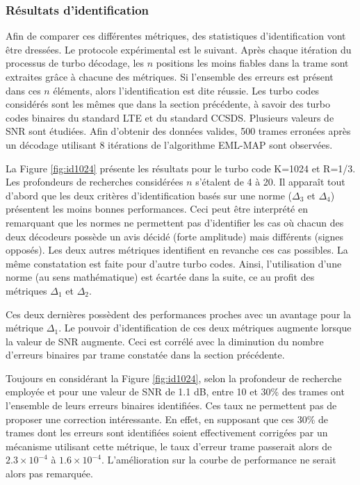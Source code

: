 \subsubsection{Résultats d'identification}
Afin de comparer ces différentes métriques, des statistiques d'identification vont être dressées. Le protocole 
expérimental est le suivant. Après chaque itération du processus de turbo décodage, les $n$ positions les moins fiables
dans la trame sont extraites grâce à chacune des métriques. Si l'ensemble des erreurs est présent dans ces $n$ éléments,
alors l'identification est dite réussie. Les turbo codes considérés sont les mêmes que dans la section précédente, à 
savoir des turbo codes binaires du standard LTE et du standard CCSDS. Plusieurs valeurs de SNR sont étudiées. Afin 
d'obtenir des données valides, 500 trames erronées après un décodage utilisant 8 itérations de l'algorithme EML-MAP sont
observées.

La Figure \ref{fig:id1024} présente les résultats pour le turbo code K=1024 et R=1/3. Les profondeurs de recherches 
considérées $n$ s'étalent de 4 à 20. Il apparaît tout d'abord que 
les deux critères d'identification basés sur une norme ($\Delta_3$ et $\Delta_4$) présentent les moins bonnes performances.
 Ceci peut être interprété en remarquant que les normes ne permettent pas d'identifier les
cas où chacun des deux décodeurs possède un avis décidé (forte amplitude) mais différents (signes opposés). Les deux 
autres métriques identifient en revanche ces cas possibles. La même constatation est faite pour d'autre turbo codes. 
Ainsi, l'utilisation d'une norme (au sens mathématique) est écartée dans la suite, ce au profit des métriques $\Delta_1$ 
et $\Delta_2$.

Ces deux dernières possèdent des performances proches avec un avantage pour la métrique $\Delta_1$. Le pouvoir 
d'identification de ces deux métriques augmente lorsque la valeur de SNR augmente. Ceci est corrélé avec la diminution du 
nombre d'erreurs binaires par trame constatée dans la section précédente.

Toujours en considérant la Figure \ref{fig:id1024}, selon la profondeur de recherche employée et pour une valeur de SNR 
de 1.1 dB, entre 10 et 30\% des trames ont l'ensemble de leurs erreurs binaires identifiées. Ces taux ne 
permettent pas de proposer une correction intéressante. En effet, en supposant que ces 30\% de trames dont les erreurs sont 
identifiées soient effectivement corrigées par un mécanisme utilisant cette métrique, le taux d'erreur trame passerait alors 
de $2.3\times 10^{-4}$ à $1.6\times 10^{-4}$. L'amélioration sur la courbe de performance ne serait alors pas remarquée.

